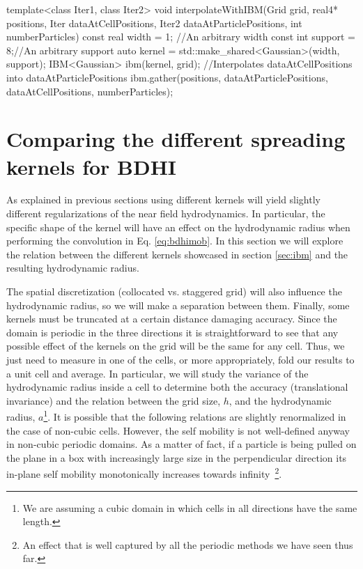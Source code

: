 \documentclass[twoside,openright,titlepage,numbers=noenddot,%
headinclude,footinclude,cleardoublepage=empty,abstract=on,
BCOR=5mm,fontsize=11pt, dvipsnames, paper=b5
]{scrreprt}
\begin{document}
\begin{code2}
template<class Iter1, class Iter2>
void interpolateWithIBM(Grid grid, real4* positions,
                        Iter dataAtCellPositions,
                        Iter2 dataAtParticlePositions,
                        int numberParticles){
  const real width = 1; //An arbitrary width
  const int support = 8;//An arbitrary support
  auto kernel = std::make_shared<Gaussian>(width, support);
  IBM<Gaussian> ibm(kernel, grid);
  //Interpolates dataAtCellPositions into dataAtParticlePositions
  ibm.gather(positions, dataAtParticlePositions, dataAtCellPositions, numberParticles);
}

\end{code2}




\section{Comparing the different spreading kernels for BDHI}\label{sec:kernelcomp}
As explained in previous sections using different kernels will yield slightly different regularizations of the near field hydrodynamics. In particular, the specific shape of the kernel will have an effect on the hydrodynamic radius when performing the convolution in Eq. \eqref{eq:bdhimob}. In this section we will explore the relation between the different kernels showcased in section \ref{sec:ibm} and the resulting hydrodynamic radius. %

The spatial discretization (collocated vs. staggered grid) will also influence the hydrodynamic radius, so we will make a separation between them.
Finally, some kernels must be truncated at a certain distance damaging accuracy.
Since the domain is periodic in the three directions it is straightforward to see that any possible effect of the kernels on the grid will be the same for any cell. Thus, we just need to measure in one of the cells, or more appropriately, fold our results to a unit cell and average.
In particular, we will study the variance of the hydrodynamic radius inside a cell to determine both the accuracy (translational invariance) and the relation between the grid size, $h$, and the hydrodynamic radius, $a$\footnote{We are assuming a cubic domain in which cells in all directions have the same length.}. It is possible that the following relations are slightly renormalized in the case of non-cubic cells. However, the self mobility is not well-defined anyway in non-cubic periodic domains. As a matter of fact, if a particle is being pulled on the plane in a box with increasingly large size in the perpendicular direction its in-plane self mobility monotonically increases towards infinity~\cite{Vogele2016}\footnote{An effect that is well captured by all the periodic methods we have seen thus far.}.
\end{document}
